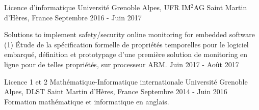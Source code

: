 \begin{cventries}
\vspace{-.5cm}

\vspace{-.2cm}

\cventry
{Licence d'informatique} %
{Université Grenoble Alpes, UFR IM$^2$AG} %
{Saint Martin d'Hères, France} %
{Septembre 2016 - Juin 2017} %
{}

%
{}%
{}%
{}%
{
  \begin{cvdescription}
    {Solutions to implement safety/security online monitoring for
      embedded software (1)}%
    {Étude de la spécification formelle de propriétés temporelles pour
      le logiciel embarqué, définition et prototypage d'une première
      solution de monitoring en ligne pour de telles propriétés, sur
      processeur ARM.}%
    {Juin 2017 - Août 2017}
  \end{cvdescription}
}

\vspace{-.2cm}


\cventry
{Licence 1 et 2 Mathématique-Informatique internationale} %
{Université Grenoble Alpes, DLST} %
{Saint Martin d'Hères, France} %
{Septembre 2014 - Juin 2016} %
{Formation mathématique et informatique en anglais.}


\vspace{-.3cm}

\end{cventries}
